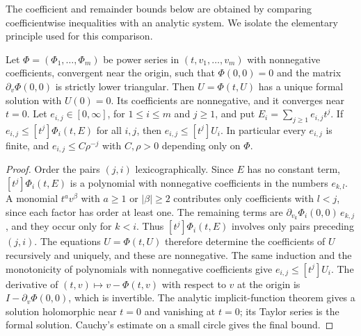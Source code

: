 The coefficient and remainder bounds below are obtained by comparing
coefficientwise inequalities with an analytic system. We isolate the
elementary principle used for this comparison.

\begin{lemma}\label{lem:majorant}
Let $\Phi=(\Phi_1,\ldots,\Phi_m)$ be power series in
$(t,v_1,\ldots,v_m)$ with nonnegative coefficients, convergent near the
origin, such that $\Phi(0,0)=0$ and the matrix $\partial_v\Phi(0,0)$ is
strictly lower triangular. Then $U=\Phi(t,U)$ has a unique formal
solution with $U(0)=0$. Its coefficients are nonnegative, and it
converges near $t=0$. Let $e_{i,j}\in[0,\infty]$, for $1\le i\le m$ and
$j\ge1$, and put $E_i=\sum_{j\ge1}e_{i,j}t^j$. If
$e_{i,j}\le[t^j]\Phi_i(t,E)$ for all $i,j$, then
$e_{i,j}\le[t^j]U_i$. In particular every $e_{i,j}$ is finite, and
$e_{i,j}\le C\rho^{-j}$ with $C,\rho>0$ depending only on $\Phi$.
\end{lemma}
\begin{proof}
Order the pairs $(j,i)$ lexicographically. Since $E$ has no constant
term, $[t^j]\Phi_i(t,E)$ is a polynomial with nonnegative coefficients
in the numbers $e_{k,l}$. A monomial $t^av^\beta$ with $a\ge1$ or
$|\beta|\ge2$ contributes only coefficients with $l<j$, since each
factor has order at least one. The remaining terms are
$\partial_{v_k}\Phi_i(0,0)\,e_{k,j}$, and they occur only for $k<i$.
Thus $[t^j]\Phi_i(t,E)$ involves only pairs preceding $(j,i)$. The
equations $U=\Phi(t,U)$ therefore determine the coefficients of $U$
recursively and uniquely, and these are nonnegative. The same induction
and the monotonicity of polynomials with nonnegative coefficients give
$e_{i,j}\le[t^j]U_i$. The derivative of $(t,v)\mapsto v-\Phi(t,v)$
with respect to $v$ at the origin is $I-\partial_v\Phi(0,0)$, which is
invertible. The analytic implicit-function theorem gives a solution
holomorphic near $t=0$ and vanishing at $t=0$; its Taylor series is the
formal solution. Cauchy's estimate on a small circle gives the final
bound.
\end{proof}

